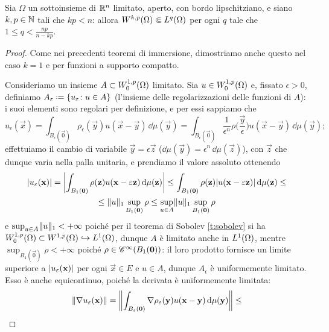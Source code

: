 \begin{teorema} \label{t:rellich-kondrachov}
    Sia $\Omega$ un sottoinsieme di $\R^n$ limitato, aperto, con bordo lipschitziano, e siano $k,p\in\N$ tali che $kp<n$: allora $\sobW[k,p]{\Omega}\cemb\leb[q]{\Omega}$ per ogni $q$ tale che $1\le q<\frac{np}{n-kp}$.
\end{teorema}
\begin{proof}
    Come nei precedenti teoremi di immersione, dimostriamo anche questo nel caso $k=1$ e per funzioni a supporto compatto.

    Consideriamo un insieme $A\subset\sobWc[1,p]{\Omega}$ limitato.
    Sia $u\in\sobWc[1,p]{\Omega}$ e, fissato $\epsilon>0$, definiamo $A_\epsilon\defeq\{u_\epsilon\colon u\in A\}$ (l'insieme delle regolarizzazioni delle funzioni di $A$): i suoi elementi sono regolari per definizione, e per essi sappiamo che
    \begin{equation}
        u_\epsilon(\vec x)=
        \int_{B_\epsilon(\vec 0)} \rho_\epsilon(\vec y)u(\vec x-\vec y)\,\dd\mu(\vec y)=
        \int_{B_\epsilon(\vec 0)} \frac1{\epsilon^n}\rho\biggl(\frac{\vec y}{\epsilon}\biggr)u(\vec x-\vec y)\,\dd\mu(\vec y);
    \end{equation}
    effettuiamo il cambio di variabile $\vec y=\epsilon\vec z$ ($\dd\mu(\vec y)=\epsilon^n\,\dd\mu(\vec z)$), con $\vec z$ che dunque varia nella palla unitaria, e prendiamo il valore assoluto ottenendo
    \begin{multline}
        \abs{u_\epsilon(\vec x)}=
        \abs[\bigg]{\int_{B_1(\vec 0)} \rho(\vec z)u(\vec x-\epsilon\vec z)\,\dd\mu(\vec z)}\le
        \int_{B_1(\vec 0)} \rho(\vec z)\abs{u(\vec x-\epsilon\vec z)}\,\dd\mu(\vec z)\le\\ \le
        \norm{u}_1\sup_{B_1(\vec 0)}\rho\le
        \sup_{u\in A}\norm{u}_1\sup_{B_1(\vec 0)}\rho
    \end{multline}
    e $\sup_{u\in A}\norm{u}_1<+\infty$ poich\'e per il teorema di Sobolev \ref{t:sobolev} si ha $\sobWc[1,p]{\Omega}\subset\sobW[1,p]{\Omega}\emb\leb[1]{\Omega}$, dunque $A$ è limitato anche in $\leb[1]{\Omega}$, mentre $\sup_{B_1(\vec 0)}\rho<+\infty$ poich\'e $\rho\in\cont[\infty]{B_1(\vec 0)}$: il loro prodotto fornisce un limite superiore a $\abs{u_\epsilon(\vec x)}$ per ogni $\vec x\in E$ e $u\in A$, dunque $A_\epsilon$ è uniformemente limitato.
    Esso è anche equicontinuo, poich\'e la derivata è uniformemente limitata:
    \begin{multline}
        \norm{\grad u_\epsilon(\vec x)}=
        \norm[\bigg]{\int_{B_\epsilon(\vec 0)}\grad\rho_\epsilon(\vec y)u(\vec x-\vec y)\,\dd\mu(\vec y)}\le

\end{multline}
\end{proof}
